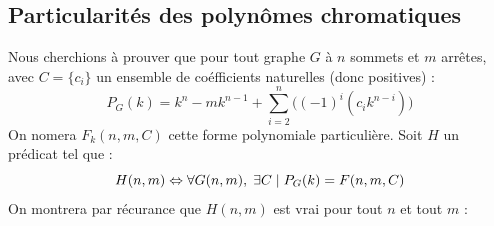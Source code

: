 \subsection{Particularités des polynômes chromatiques}
Nous cherchions à prouver que pour tout graphe $G$ à $n$ sommets et $m$ arrêtes, avec $C = \{c_i\}$ un ensemble de coéfficients naturelles (donc positives) : 
\[ P_G(k) = k^n - mk^{n-1} + \sum_{i = 2}^n \Big((-1)^i(c_ik^{n-i})\Big) \]
On nomera $F_k(n,m,C)$ cette forme polynomiale particulière. Soit $H$ un prédicat tel que :
\[ H(n,m) \Leftrightarrow \forall{G(n,m)}, \hspace{1mm} \exists{C} \hspace{1mm} 
										| \hspace{1mm} P_G(k) = F(n, m, C) \]
On montrera par récurance que $H(n,m)$ est vrai pour tout $n$ et tout $m$ :
